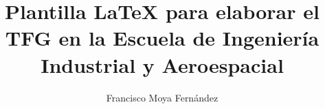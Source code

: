 
\title{Plantilla \LaTeX{} para elaborar el TFG en la Escuela de Ingeniería Industrial y Aeroespacial}
\author{Francisco Moya Fernández}










\address{UCLM --- Escuela de Ingeniería Industrial y Aeroespacial\\
    Campus Universitario de la Real Fábrica de Armas}
